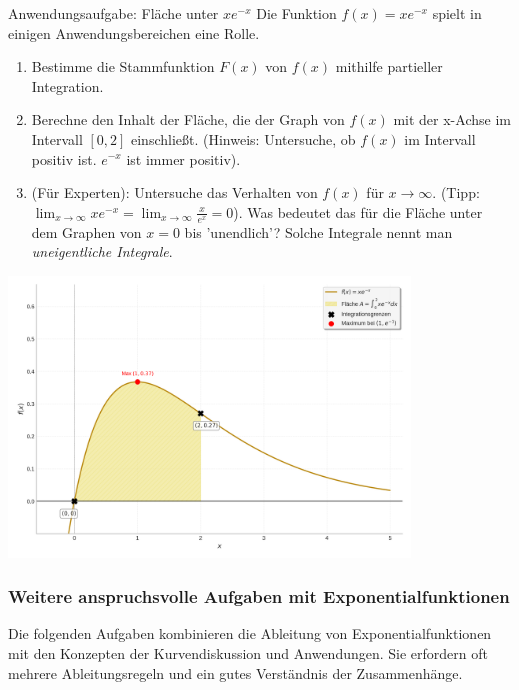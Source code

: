 \begin{aufgabenumgebung}{Anwendungsaufgabe: Fläche unter $xe^{-x}$}
Die Funktion $f(x) = xe^{-x}$ spielt in einigen Anwendungsbereichen eine Rolle.
\begin{enumerate}
    \item Bestimme die Stammfunktion $F(x)$ von $f(x)$ mithilfe partieller Integration.
    \item Berechne den Inhalt der Fläche, die der Graph von $f(x)$ mit der x-Achse im Intervall $[0, 2]$ einschließt. (Hinweis: Untersuche, ob $f(x)$ im Intervall positiv ist. $e^{-x}$ ist immer positiv).
    \item (Für Experten): Untersuche das Verhalten von $f(x)$ für $x \to \infty$. (Tipp: $\lim_{x \to \infty} xe^{-x} = \lim_{x \to \infty} \frac{x}{e^x} = 0$). Was bedeutet das für die Fläche unter dem Graphen von $x=0$ bis 'unendlich'? Solche Integrale nennt man \textit{uneigentliche Integrale}.
\end{enumerate}
\begin{center}
    \includegraphics[width=0.8\textwidth]{grafiken/Integral_Flaeche_xehochminusx.png}
    \label{fig:flaeche_xehochminusx}
\end{center}
\end{aufgabenumgebung}

\subsubsection{Weitere anspruchsvolle Aufgaben mit Exponentialfunktionen}
\label{subsubsec:exp_anwendungen_vertiefung_neu}

Die folgenden Aufgaben kombinieren die Ableitung von Exponentialfunktionen mit den Konzepten der Kurvendiskussion und Anwendungen. Sie erfordern oft mehrere Ableitungsregeln und ein gutes Verständnis der Zusammenhänge.

